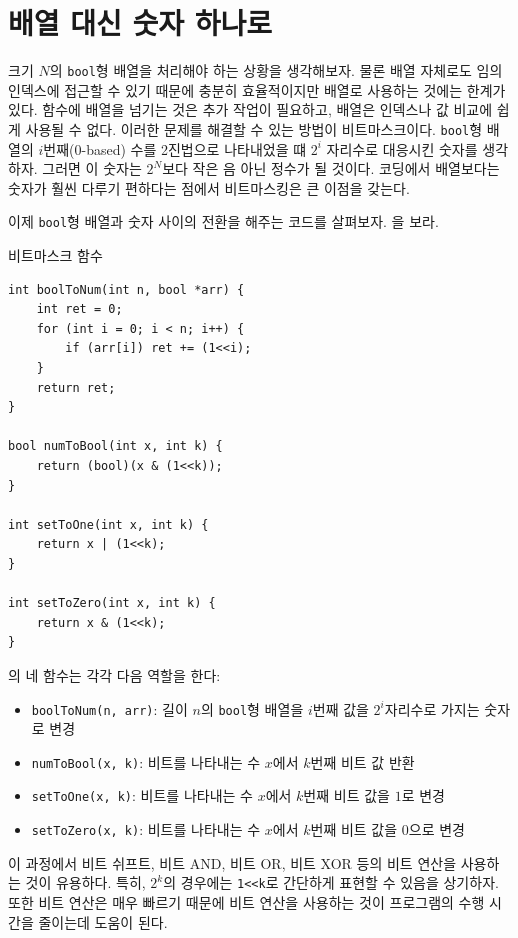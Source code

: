 \section{배열 대신 숫자 하나로}
크기 $N$의 \texttt{bool}형 배열을 처리해야 하는 상황을 생각해보자. 물론 배열 자체로도 임의 인덱스에 접근할 수 있기 때문에 충분히 효율적이지만 배열로 사용하는 것에는 한계가 있다. 함수에 배열을 넘기는 것은 추가 작업이 필요하고, 배열은 인덱스나 값 비교에 쉽게 사용될 수 없다. 이러한 문제를 해결할 수 있는 방법이 비트마스크이다.
\texttt{bool}형 배열의 $i$번째(0-based) 수를 2진법으로 나타내었을 떄 $2^i$ 자리수로 대응시킨 숫자를 생각하자. 그러면 이 숫자는 $2^N$보다 작은 음 아닌 정수가 될 것이다. 코딩에서 배열보다는 숫자가 훨씬 다루기 편하다는 점에서 비트마스킹은 큰 이점을 갖는다.

이제 \texttt{bool}형 배열과 숫자 사이의 전환을 해주는 코드를 살펴보자. 을 보라.

\begin{code} \label{code: bitmask}
비트마스크 함수
\begin{lstlisting}
int boolToNum(int n, bool *arr) {
    int ret = 0;
    for (int i = 0; i < n; i++) {
        if (arr[i]) ret += (1<<i);
    }
    return ret;
}

bool numToBool(int x, int k) {
    return (bool)(x & (1<<k));
}

int setToOne(int x, int k) {
    return x | (1<<k);
}

int setToZero(int x, int k) {
    return x & (1<<k);
}
\end{lstlisting}
\end{code}

의 네 함수는 각각 다음 역할을 한다:
\begin{itemize}
    \item \texttt{boolToNum(n, arr)}: 길이 $n$의 \texttt{bool}형 배열을 $i$번째 값을 $2^i$자리수로 가지는 숫자로 변경
    \item \texttt{numToBool(x, k)}: 비트를 나타내는 수 $x$에서 $k$번째 비트 값 반환
    \item \texttt{setToOne(x, k)}: 비트를 나타내는 수 $x$에서 $k$번째 비트 값을 $1$로 변경
    \item \texttt{setToZero(x, k)}: 비트를 나타내는 수 $x$에서 $k$번째 비트 값을 $0$으로 변경
\end{itemize}

이 과정에서 비트 쉬프트, 비트 AND, 비트 OR, 비트 XOR 등의 비트 연산을 사용하는 것이 유용하다. 특히, $2^k$의 경우에는 \texttt{1<<k}로 간단하게 표현할 수 있음을 상기하자. 또한 비트 연산은 매우 빠르기 때문에 비트 연산을 사용하는 것이 프로그램의 수행 시간을 줄이는데 도움이 된다.

